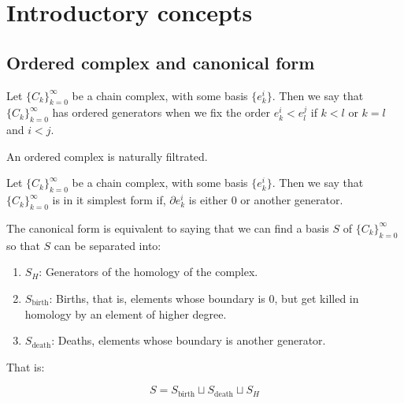 \chapter{Introductory concepts}

\newcommand{\R}{\mathbb{R}}

\section{Ordered complex and canonical form}

\begin{definition}[$\R$-Filtered complex]

\end{definition}

\begin{definition}

Let $\{C_k\}_{k=0}^{\infty}$ be a chain complex, with some basis $\{e_k^i\}$.
Then we say that $\{C_k\}_{k=0}^{\infty}$ has ordered generators when we fix the order 
$e_k^i<e_l^j$ if $k<l$ or $k=l$ and $i<j$.

\end{definition}

\begin{remark}
An ordered complex is naturally filtrated.
\end{remark}


\begin{definition}

Let $\{C_k\}_{k=0}^{\infty}$ be a chain complex, with some basis $\{e_k^i\}$.
Then we say that $\{C_k\}_{k=0}^{\infty}$ is in it simplest form if, $\partial e_k^i$
is either $0$ or another generator.
\end{definition}

\begin{remark}
The canonical form is equivalent to saying that we can find a basis $S$ 
of $\{C_k\}_{k=0}^{\infty}$ so that $S$
can be separated into: 
\begin{enumerate}
\item $S_H$: Generators of the homology of the complex.

\item $S_{\text{birth}}$: Births, that is, elements whose boundary is $0$, but get killed in homology by an element of higher degree.

\item $S_{\text{death}}$: Deaths, elements whose boundary is another generator. 
\end{enumerate}

That is:

$$
S=S_{\text{birth}}\sqcup
S_{\text{death}}\sqcup
 S_H
$$ 
\end{remark}

